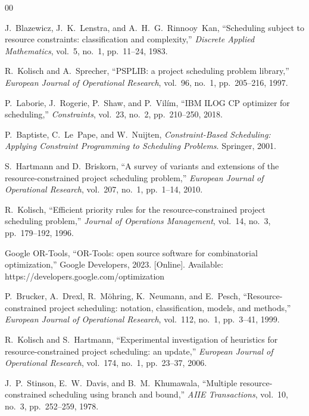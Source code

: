 \documentclass[conference]{IEEEtran}
\begin{document}
\begin{thebibliography}{00}

J.~Blazewicz, J.~K.~Lenstra, and A.~H.~G.~Rinnooy~Kan,
``Scheduling subject to resource constraints: classification and
complexity,''
\textit{Discrete Applied Mathematics}, vol.~5, no.~1, pp.~11--24, 1983.

R.~Kolisch and A.~Sprecher,
``PSPLIB: a project scheduling problem library,''
\textit{European Journal of Operational Research}, vol.~96, no.~1,
pp.~205--216, 1997.

P.~Laborie, J.~Rogerie, P.~Shaw, and P.~Vil\'im,
``IBM ILOG CP optimizer for scheduling,''
\textit{Constraints}, vol.~23, no.~2, pp.~210--250, 2018.

P.~Baptiste, C.~Le~Pape, and W.~Nuijten,
\textit{Constraint-Based Scheduling: Applying Constraint Programming
to Scheduling Problems}.
Springer, 2001.

S.~Hartmann and D.~Briskorn,
``A survey of variants and extensions of the resource-constrained
project scheduling problem,''
\textit{European Journal of Operational Research}, vol.~207, no.~1,
pp.~1--14, 2010.

R.~Kolisch,
``Efficient priority rules for the resource-constrained project
scheduling problem,''
\textit{Journal of Operations Management}, vol.~14, no.~3,
pp.~179--192, 1996.

Google OR-Tools,
``OR-Tools: open source software for combinatorial optimization,''
Google Developers, 2023. [Online].
Available: https://developers.google.com/optimization

P.~Brucker, A.~Drexl, R.~M\"ohring, K.~Neumann, and E.~Pesch,
``Resource-constrained project scheduling: notation, classification,
models, and methods,''
\textit{European Journal of Operational Research}, vol.~112, no.~1,
pp.~3--41, 1999.

R.~Kolisch and S.~Hartmann,
``Experimental investigation of heuristics for resource-constrained
project scheduling: an update,''
\textit{European Journal of Operational Research}, vol.~174, no.~1,
pp.~23--37, 2006.

J.~P.~Stinson, E.~W.~Davis, and B.~M.~Khumawala,
``Multiple resource-constrained scheduling using branch and bound,''
\textit{AIIE Transactions}, vol.~10, no.~3, pp.~252--259, 1978.


\end{thebibliography}
\end{document}
